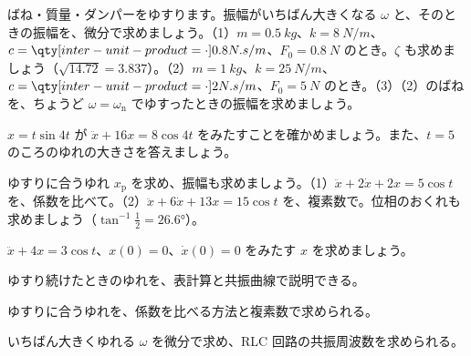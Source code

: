 \bkproblem ばね・質量・ダンパーをゆすります。振幅がいちばん大きくなる $\omega$ と、そのときの振幅を、微分で求めましょう。\newline（1）$m=\qty{0.5}{kg}$、$k=\qty{8}{N/m}$、$c=\bkvinNsm{0.8}$、$F_0=\qty{0.8}{N}$ のとき。$\zeta$ も求めましょう（$\sqrt{14.72}=3.837$）。\newline（2）$m=\qty{1}{kg}$、$k=\qty{25}{N/m}$、$c=\bkvinNsm{2}$、$F_0=\qty{5}{N}$ のとき。\newline（3）（2）のばねを、ちょうど $\omega=\omega_{\mathrm n}$ でゆすったときの振幅を求めましょう。

\bkproblem $x=t\sin4t$ が $\ddot x+16x=8\cos4t$ をみたすことを確かめましょう。また、$t=5$ のころのゆれの大きさを答えましょう。

\bkproblem ゆすりに合うゆれ $x_{\mathrm p}$ を求め、振幅も求めましょう。\newline（1）$\ddot x+2\dot x+2x=5\cos t$ を、係数を比べて。\newline（2）$\ddot x+6\dot x+13x=15\cos t$ を、複素数で。位相のおくれも求めましょう（$\tan^{-1}\frac12=26.6°$）。

\bkproblem $\ddot x+4x=3\cos t$、$x(0)=0$、$\dot x(0)=0$ をみたす $x$ を求めましょう。

\begin{furikaeri}
\begin{checklist}
\item ゆすり続けたときのゆれを、表計算と共振曲線で説明できる。
\item ゆすりに合うゆれを、係数を比べる方法と複素数で求められる。
\item いちばん大きくゆれる $\omega$ を微分で求め、RLC 回路の共振周波数を求められる。
\end{checklist}
\end{furikaeri}

